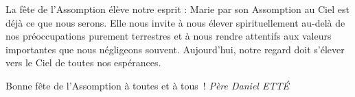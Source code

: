 La fête de l'Assomption élève notre esprit : Marie par son Assomption au Ciel est déjà ce que nous serons. Elle nous invite à nous élever spirituellement au-delà de nos préoccupations purement terrestres et à nous rendre attentifs aux valeurs importantes que nous négligeons souvent.
Aujourd’hui, notre regard doit s’élever vers le Ciel de toutes nos espérances.

\begin{flushright}
Bonne fête de l’Assomption à toutes et à tous !
\textit{Père  Daniel  ETTÉ}
\end{flushright}


